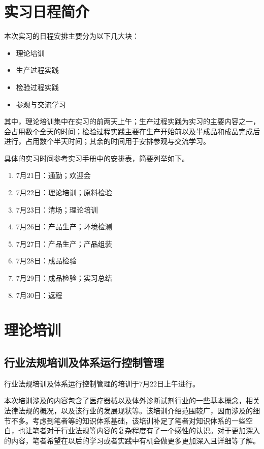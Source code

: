 \section{实习日程简介}

本次实习的日程安排主要分为以下几大块：
\begin{itemize}
    \item 理论培训
    \item 生产过程实践
    \item 检验过程实践
    \item 参观与交流学习
\end{itemize}

其中，理论培训集中在实习的前两天上午；生产过程实践为实习的主要内容之一，会占用数个全天的时间；检验过程实践主要在生产开始前以及半成品和成品完成后进行，占用数个半天时间；其余的时间用于安排参观与交流学习。

具体的实习时间参考实习手册中的安排表，简要列举如下。

\begin{enumerate}
    \item 7月21日：通勤；欢迎会
    \item 7月22日：理论培训；原料检验
    \item 7月23日：清场；理论培训
    \item 7月26日：产品生产；环境检测
    \item 7月27日：产品生产；产品组装
    \item 7月28日：成品检验
    \item 7月29日：成品检验；实习总结
    \item 7月30日：返程
\end{enumerate}

\section{理论培训}

\subsection{行业法规培训及体系运行控制管理}
行业法规培训及体系运行控制管理的培训于7月22日上午进行。

本次培训涉及的内容包含了医疗器械以及体外诊断试剂行业的一些基本概念，相关法律法规的概况，以及该行业的发展现状等。该培训介绍范围较广，因而涉及的细节不多。考虑到笔者等的知识体系基础，该培训补足了笔者对知识体系的一些空白，也让笔者对于行业法规等内容的复杂程度有了一个感性的认识。对于更加深入的内容，笔者希望在以后的学习或者实践中有机会做更多更加深入且详细等了解。

